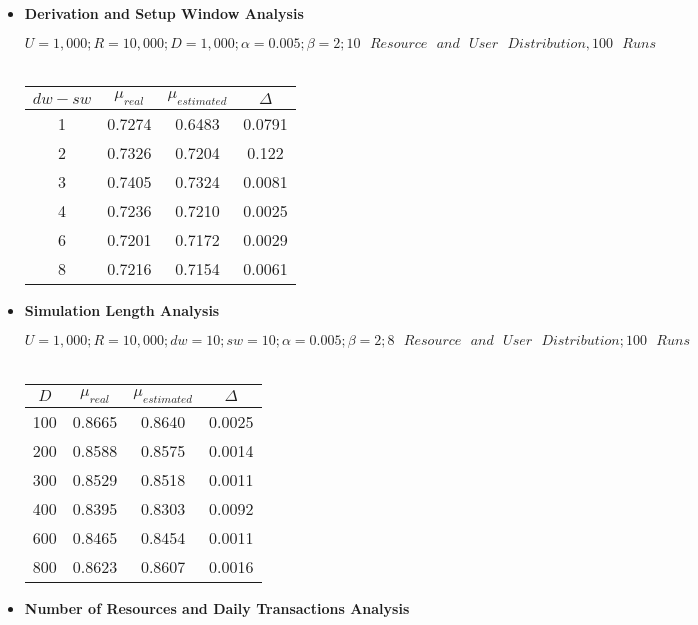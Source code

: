 \documentclass[12pt,a4paper]{report}
\begin{document}
\begin{itemize}
	\item \textbf{Derivation and Setup Window Analysis}

\begin{center}
\textup{\textbf{$U=1,000; R=10,000; D=1,000; \alpha=0.005; \beta=2; 10\text{ }Resource\text{ }and\text{ }User\text{ }Distribution, 100\text{ }Runs$\\}}
\textup{\\}
\begin{tabular}{|c|c|c|c|}
\hline
\textbf{$dw-sw$} & \textbf{$\mu_{real}$} & \textbf{$\mu_{estimated}$} & \textbf{$\Delta$}\\
\hline
1 & 0.7274 & 0.6483 & 0.0791 \\
\hline
2 & 0.7326 & 0.7204 & 0.122 \\
\hline
3 & 0.7405 & 0.7324 & 0.0081 \\
\hline
4 & 0.7236 & 0.7210 & 0.0025 \\
\hline
6 & 0.7201 & 0.7172 & 0.0029 \\
\hline
8 & 0.7216 & 0.7154 & 0.0061 \\
\hline
\end{tabular}
\end{center}

	\item \textbf{Simulation Length Analysis}

\begin{center}
\textup{\textbf{$U=1,000; R=10,000; dw=10; sw=10; \alpha=0.005; \beta=2; 8\text{ }Resource\text{ }and\text{ }User\text{ }Distribution; 100\text{ }Runs$\\}}
\textup{\\}
\begin{tabular}{|c|c|c|c|}
\hline
\textbf{$D$} & \textbf{$\mu_{real}$} & \textbf{$\mu_{estimated}$} & \textbf{$\Delta$}\\
\hline
100 & 0.8665 & 0.8640 & 0.0025 \\
\hline
200 & 0.8588 & 0.8575  & 0.0014 \\
\hline
300 & 0.8529 & 0.8518  & 0.0011 \\
\hline
400 & 0.8395 & 0.8303 & 0.0092 \\
\hline
600 & 0.8465 & 0.8454 & 0.0011 \\
\hline
800 & 0.8623 & 0.8607 & 0.0016 \\
\hline
\end{tabular}
\end{center}


	\item \textbf{Number of Resources and Daily Transactions Analysis}


\end{itemize}
\end{document}

